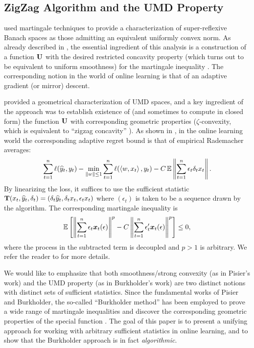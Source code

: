 
\subsection{ZigZag Algorithm and the UMD Property}

\cite{Pisier75} used martingale techniques to provide a characterization of super-reflexive Banach spaces as those admitting an equivalent uniformly convex norm. As already described in , the essential ingredient of this analysis is a construction of a function $\mathbf{U}$ with the desired restricted concavity property (which turns out to be equivalent to uniform smoothness) for the martingale inequality . The corresponding notion in the world of online learning is that of an adaptive gradient (or mirror) descent. 

\cite{burkholder1981geometrical} provided a geometrical characterization of UMD spaces, and a key ingredient of the approach was to establish existence of (and sometimes to compute in closed form) the function $\mathbf{U}$ with corresponding geometric properties ($\zeta$-convexity, which is equivalent to  ``zigzag concavity'' \citep{osekowski2012sharp}). As shown in \citep{foster2017zigzag}, in the online learning world the corresponding adaptive regret bound is that of empirical Rademacher averages:
$$\sum_{t=1}^n{\ell}({\widehat{y}}_t,y_t) - \min_{\left\|w\right\|\leq 1}\sum_{t=1}^n {\ell}(\left\langle w,x_t \right\rangle,y_t) - C\operatorname{\mathbb{E}}\left\|\sum_{t=1}^n \epsilon_t \delta_t x_t\right\|.$$
By linearizing the loss, it suffices to use the sufficient statistic $\mathbf{T}(x_t,{\widehat{y}}_t,\delta_t)= (\delta_t{\widehat{y}}_t, \delta_t x_t, \epsilon_t x_t)$ where $(\epsilon_t)$ is taken to be a sequence drawn by the algorithm.
The corresponding martingale inequality is
\begin{align}
	\label{eq:umd_martingale_ineq}
	\operatorname{\mathbb{E}}\left[ \left\|\sum_{t=1}^n \epsilon_t\boldsymbol{x}_t(\epsilon)\right\|^p - C\left\|\sum_{t=1}^n \epsilon_t'\boldsymbol{x}_t(\epsilon)\right\|^p\right] \leq 0,
\end{align}
where the process in the subtracted term is decoupled and $p>1$ is arbitrary. We refer the reader to \citep{foster2017zigzag} for more details. 

We would like to emphasize that both smoothness/strong convexity (as in Pisier's work) and the UMD property (as in Burkholder's work) are two distinct notions with distinct sets of sufficient statistics. Since the fundamental works of Pisier and Burkholder, the so-called ``Burkholder method'' has been employed to prove a wide range of martingale inequalities and discover the corresponding geometric properties of the special function \citep{osekowski2012sharp,hytonen2016analysis}. The goal of this paper is to present a unifying approach for working with arbitrary sufficient statistics in online learning, and to show that the Burkholder approach is in fact \emph{algorithmic}. 


